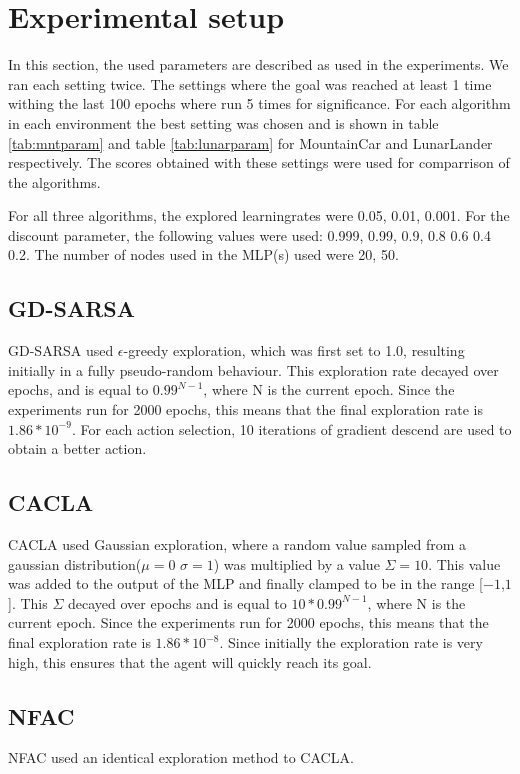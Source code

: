 
\section{Experimental setup}


In this section, the used parameters are described as used in the experiments. We ran each setting twice. The settings where the goal was reached at least 1 time withing the last 100 epochs where run 5 times for significance. For each algorithm in each environment the best setting was chosen and is shown in table \ref{tab:mntparam} and table \ref{tab:lunarparam} for MountainCar and LunarLander respectively. The scores obtained with these settings were used for comparrison of the algorithms. 

For all three algorithms, the explored learningrates were 0.05, 0.01, 0.001. For the discount parameter, the following values were used: 0.999, 0.99, 0.9, 0.8 0.6 0.4 0.2. The number of nodes used in the MLP(s) used were 20, 50.

\subsection{GD-SARSA}
GD-SARSA used $\epsilon$-greedy exploration, which was first set to 1.0, resulting initially in a fully pseudo-random behaviour. This exploration rate decayed over epochs, and is equal to $0.99^{N-1}$, where N is the current epoch. Since the experiments run for 2000 epochs, this means that the final exploration rate is $1.86*10^{-9}$. For each action selection, 10 iterations of gradient descend are used to obtain a better action. 
\subsection{CACLA}
CACLA used Gaussian exploration, where a random value sampled from a gaussian distribution($\mu=0$ $\sigma=1$) was multiplied by a value $\Sigma=10$. This value was added to the output of the MLP and finally clamped to be in the range [$-1$,$1$]. This $\Sigma$ decayed over epochs and is equal to  $10 * 0.99^{N-1}$, where N is the current epoch. Since the experiments run for 2000 epochs, this means that the final exploration rate is $1.86*10^{-8}$. Since initially the exploration rate is very high, this ensures that the agent will quickly reach its goal. 
\subsection{NFAC}
NFAC used an identical exploration method to CACLA.


